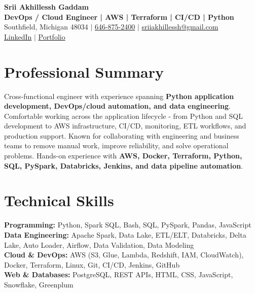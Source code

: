 \documentclass[letterpaper,10pt]{article}
\begin{document}
\fontsize{9.35pt}{10.45pt}\selectfont

\begin{center}
    {\LARGE \textbf{Srii Akhillessh Gaddam}} \\[-1pt]
    \textbf{DevOps / Cloud Engineer | AWS | Terraform | CI/CD | Python} \\[2pt]
    Southfield, Michigan 48034 $|$
    \href{tel:6468752400}{646-875-2400} $|$
    \href{mailto:sriiakhillessh@gmail.com}{sriiakhillessh@gmail.com} \\[1pt]
    \href{https://www.linkedin.com/in/srii-akhiilessh-gaddam-b48668191/}{LinkedIn} $|$
    \href{https://sriiakhillesshg.github.io/portfolio/}{Portfolio}
\end{center}
\vspace{-8pt}

\section{Professional Summary}
\small{Cross-functional engineer with experience spanning \textbf{Python application development, DevOps/cloud automation, and data engineering}. Comfortable working across the application lifecycle - from Python and SQL development to AWS infrastructure, CI/CD, monitoring, ETL workflows, and production support. Known for collaborating with engineering and business teams to remove manual work, improve reliability, and solve operational problems. Hands-on experience with \textbf{AWS, Docker, Terraform, Python, SQL, PySpark, Databricks, Jenkins, and data pipeline automation}.}

\section{Technical Skills}
\small{
\textbf{Programming:} Python, Spark SQL, Bash, SQL, PySpark, Pandas, JavaScript \\
\textbf{Data Engineering:} Apache Spark, Data Lake, ETL/ELT, Databricks, Delta Lake, Auto Loader, Airflow, Data Validation, Data Modeling \\
\textbf{Cloud \& DevOps:} AWS (S3, Glue, Lambda, Redshift, IAM, CloudWatch), Docker, Terraform, Linux, Git, CI/CD, Jenkins, GitHub \\
\textbf{Web \& Databases:} PostgreSQL, REST APIs, HTML, CSS, JavaScript, Snowflake, Greenplum
}
\end{document}

